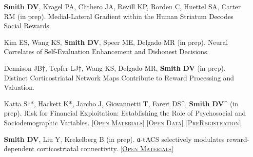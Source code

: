 \documentclass[11pt, letterpaper]{article}
\newcommand{\materials}[1]{\href{#1}{\scriptsize\textsc{[Open Materials]}}}
\newcommand{\data}[1]{\href{#1}{\scriptsize\textsc{[Open Data]}}}
\newcommand{\preregistration}[1]{\href{#1}{\scriptsize\textsc{[PreRegistration]}}}
\begin{document}
\begin{hangparas}{.5in}{1}

\textbf{Smith DV}, Kragel PA, Clithero JA, Revill KP, Rorden C, Huettel SA, Carter RM (in prep). Medial-Lateral Gradient within the Human Striatum Decodes Social Rewards.


Kim ES, Wang KS, \textbf{Smith DV}, Speer ME, Delgado MR (in prep). Neural Correlates of Self-Evaluation Enhancement and Dishonest Decisions.

Dennison JB†, Tepfer LJ†, Wang KS, Delgado MR, \textbf{Smith DV} (in prep). Distinct Corticostriatal Network Maps Contribute to Reward Processing and Valuation. 

Katta S†*, Hackett K*, Jarcho J, Giovannetti T, Fareri DS\^{}, \textbf{Smith DV}\^{} (in prep). Risk for Financial Exploitation: Establishing the Role of Psychosocial and Sociodemographic Variables. \materials{https://osf.io/hd5nx/} \data{https://osf.io/hd5nx/} \preregistration{https://osf.io/hd5nx/}

\textbf{Smith DV}, Liu Y, Krekelberg B (in prep). ɑ-tACS selectively modulates reward-dependent corticostriatal connectivity. \materials{https://github.com/DVS-Lab/r21-cardgame}


\end{hangparas}


\vspace{.4cm}
\end{document}
